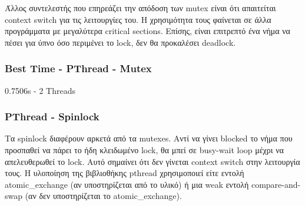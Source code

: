 \documentclass[../final_report.tex]{subfiles}
\begin{document}
Άλλος συντελεστής που επηρεάζει την απόδοση των mutex είναι ότι απαιτείται context switch για τις
λειτουργίες του. Η χρησιμότητα τους φαίνεται σε άλλα προγράμματα με μεγαλύτερα critical sections.
Επίσης, είναι επιτρεπτό ένα νήμα να πέσει για ύπνο όσο περιμένει το lock, δεν θα προκαλέσει deadlock.

\subsubsection*{Best Time - PThread - Mutex}
0.7506s - 2 Threads

\subsubsection{PThread - Spinlock}

Τα spinlock διαφέρουν αρκετά από τα mutexes. Αντί να γίνει blocked το νήμα που προσπαθεί να πάρει το ήδη
κλειδωμένο lock, θα μπεί σε busy-wait loop μέχρι να απελευθερωθεί το lock. Αυτό σημαίνει ότι δεν γίνεται
context switch στην λειτουργία τους. Η υλοποίηση της βιβλιοθήκης pthread χρησιμοποιεί είτε εντολή
atomic\_exchange (αν υποστηρίζεται από το υλικό) ή μια weak εντολή compare-and-swap (αν δεν υποστηρίζεται το atomic\_exchange).
\end{document}

